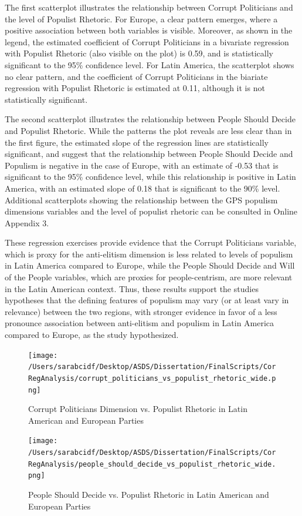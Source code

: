 \documentclass[12pt,letterpaper]{article}
\begin{document}
The first scatterplot illustrates the relationship between Corrupt Politicians and the level of Populist Rhetoric. For Europe, a clear pattern emerges, where a positive association between both variables is visible. Moreover, as shown in the legend, the estimated coefficient of Corrupt Politicians in a bivariate regression with Populist Rhetoric (also visible on the plot) is 0.59, and is statistically significant to the 95\% confidence level. For Latin America, the scatterplot shows no clear pattern, and the coefficient of Corrupt Politicians in the biariate regression with Populist Rhetoric is estimated at 0.11, although it is not statistically significant. 

The second scatterplot illustrates the relationship between People Should Decide and Populist Rhetoric. While the patterns the plot reveals are less clear than in the first figure, the estimated slope of the regression lines are statistically significant, and suggest that the relationship between People Should Decide and Populism is negative in the case of Europe, with an estimate of -0.53 that is significant to the 95\% confidence level, while this relationship is positive in Latin America, with an estimated slope of 0.18 that is significant to the 90\% level. Additional scatterplots showing the relationship between the GPS populism dimensions variables and the level of populist rhetoric can be consulted in Online Appendix 3. 

These regression exercises provide evidence that the Corrupt Politicians variable, which is proxy for the anti-elitism dimension is less related to levels of populism in Latin America compared to Europe, while the People Should Decide and Will of the People variables, which are proxies for people-centrism, are more relevant in the Latin American context. Thus, these results support the studies hypotheses that the defining features of populism may vary (or at least vary in relevance) between the two regions, with stronger evidence in favor of a less pronounce association between anti-elitism and populism in Latin America compared to Europe, as the study hypothesized. 

\begin{landscape}

\begin{figure}[H]
	\vspace{1.5cm}
	\centering
	\caption{Corrupt Politicians Dimension vs. Populist Rhetoric in Latin American and European Parties}
	\label{fig:yourfigure}
	\texttt{[image: /Users/sarabcidf/Desktop/ASDS/Dissertation/FinalScripts/CorRegAnalysis/corrupt\_politicians\_vs\_populist\_rhetoric\_wide.png]} 
\end{figure}

\begin{figure}[H]
	\vspace{1.5cm}
	\centering
	\caption{People Should Decide vs. Populist Rhetoric in Latin American and European Parties}
	\label{fig:yourfigure}
	\texttt{[image: /Users/sarabcidf/Desktop/ASDS/Dissertation/FinalScripts/CorRegAnalysis/people\_should\_decide\_vs\_populist\_rhetoric\_wide.png]} 
\end{figure}

\end{landscape}
\end{document}
